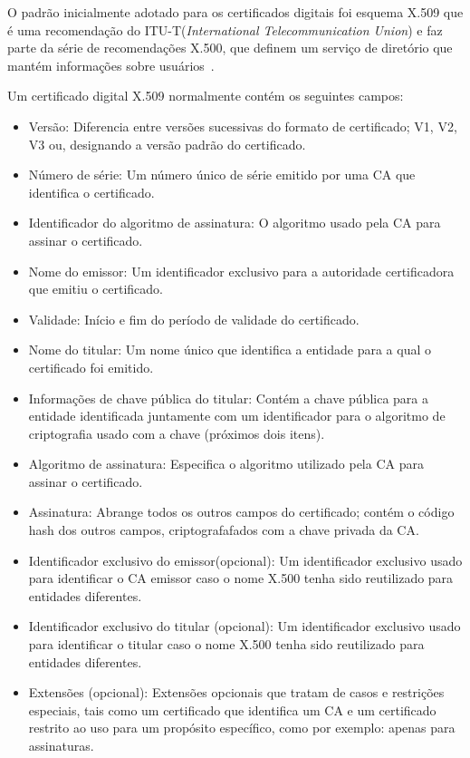 O padrão inicialmente adotado para os certificados digitais foi esquema X.509 que é uma recomendação do ITU-T(\emph{International Telecommunication Union}) e faz parte da série de recomendações X.500, que definem um serviço de diretório que mantém informações sobre usuários~\cite{stallings2008}.

Um certificado digital X.509 normalmente contém os seguintes campos:

 \begin{itemize}

\item Versão: Diferencia entre versões sucessivas do formato de certificado; V1, V2, V3 ou, designando a versão padrão do certificado.

\item Número de série: Um número único de série emitido por uma CA que identifica o certificado.
\item Identificador do algoritmo de assinatura: O algoritmo usado pela CA para assinar o certificado.
\item Nome do emissor: Um identificador exclusivo para a autoridade certificadora que emitiu o certificado.
\item Validade: Início e fim do período de validade do certificado.
\item Nome do titular:  Um nome único que identifica a entidade para a qual o certificado foi emitido.
\item Informações de chave pública do titular: Contém a chave pública para a entidade identificada juntamente com um identificador para o algoritmo de criptografia usado com a chave (próximos dois itens).
\item Algoritmo de assinatura: Especifica o algoritmo utilizado pela CA para assinar o certificado.
\item Assinatura: Abrange todos os outros campos do certificado; contém o código hash dos outros campos, criptografafados com a chave privada da CA.
\item Identificador exclusivo do emissor(opcional): Um identificador exclusivo usado para identificar o CA emissor caso o nome X.500 tenha sido reutilizado para entidades diferentes.
\item Identificador exclusivo do titular (opcional): Um identificador exclusivo usado para identificar o titular caso o nome X.500 tenha sido reutilizado para entidades diferentes.
\item Extensões (opcional): Extensões opcionais que tratam de casos e restrições especiais, tais como um certificado que identifica um CA e um certificado restrito ao uso para um propósito específico, como por exemplo: apenas para assinaturas.

\end{itemize}




